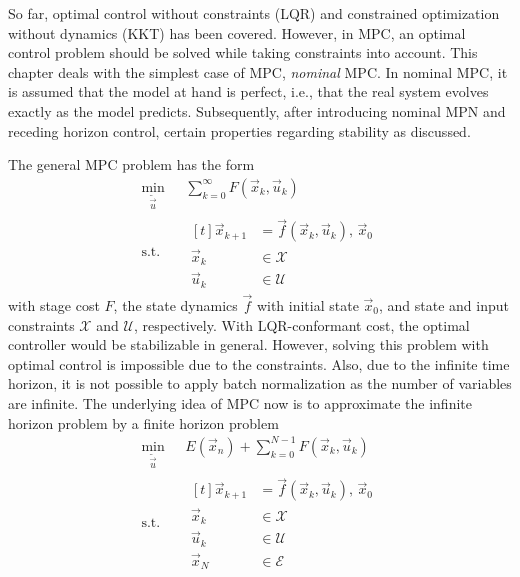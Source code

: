	So far, optimal control without constraints (LQR) and constrained optimization without dynamics (KKT) has been covered. However, in MPC, an optimal control problem should be solved while taking constraints into account. This chapter deals with the simplest case of MPC, \emph{nominal} MPC. In nominal MPC, it is assumed that the model at hand is perfect, i.e., that the real system evolves exactly as the model predicts. Subsequently, after introducing nominal MPN and receding horizon control, certain properties regarding stability as discussed.

	The general MPC problem has the form
	\begin{align}
		\min_{\tilde{\vec{u}}}\; & \sum_{k = 0}^{\infty} F(\vec{x}_k, \vec{u}_k) \\
		\text{s.t.}\quad&
			\begin{aligned}[t]
				\vec{x}_{k + 1} &= \vec{f}(\vec{x}_k, \vec{u}_k),\, \vec{x}_0 \\
				\vec{x}_k &\in \mathcal{X} \\
				\vec{u}_k &\in \mathcal{U}
			\end{aligned}
	\end{align}
	with stage cost \(F\), the state dynamics \(\vec{f}\) with initial state \(\vec{x}_0\), and state and input constraints \(\mathcal{X}\) and \(\mathcal{U}\), respectively. With LQR-conformant cost, the optimal controller would be stabilizable in general. However, solving this problem with optimal control is impossible due to the constraints. Also, due to the infinite time horizon, it is not possible to apply batch normalization as the number of variables are infinite. The underlying idea of MPC now is to approximate the infinite horizon problem by a finite horizon problem
	\begin{equation}
		\begin{aligned}
			\min_{\tilde{\vec{u}}}\, & E(\vec{x}_n) + \sum_{k = 0}^{N - 1} F(\vec{x}_k, \vec{u}_k) \\
			\text{s.t.}\quad&
				\begin{aligned}[t]
					\vec{x}_{k + 1} &= \vec{f}(\vec{x}_k, \vec{u}_k),\, \vec{x}_0 \\
					\vec{x}_k &\in \mathcal{X} \\
					\vec{u}_k &\in \mathcal{U} \\
					\vec{x}_N &\in \mathcal{E}
				\end{aligned}
		\end{aligned}
		\label{eqn:recedingHorizon}
	\end{equation}
